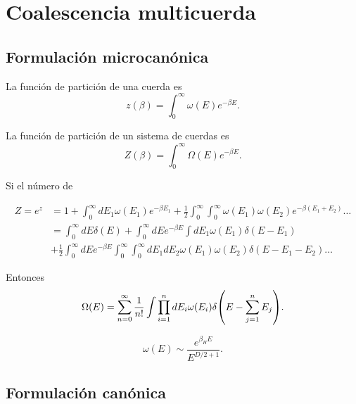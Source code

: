 \section{Coalescencia multicuerda}


\subsection{Formulación microcanónica}

La función de partición de una cuerda es
\begin{equation}
  z(\beta) = \int_0^\infty \omega(E)e^{-\beta E}.
\end{equation}

La función de partición de un sistema de cuerdas es
\begin{equation}
  Z(\beta) = \int_0^\infty \Omega(E)e^{-\beta E}.
\end{equation}

Si el número de 


\begin{equation}
  \begin{aligned}
      Z = e^z&= 1+ \int_0^\infty dE_1\omega(E_1)e^{-\beta E_1} +\frac 1 2 \int_0^\infty \int_0^\infty
      \omega(E_1)\omega(E_2)e^{-\beta(E_1+E_2)}\dots \\
      &=\int_0^\infty dE \delta(E) + \int_0^\infty dE e^{-\beta E}\int  dE_1\omega(E_1)\delta(E-E_1)\\
      &+\frac 1 2\int_0^\infty dE e^{-\beta E} \int_0^\infty\int_0^\infty dE_1 dE_2 \omega(E_1)\omega(E_2) \delta(E-E_1-E_2)\dots
  \end{aligned}
\end{equation}

Entonces
\begin{equation}
  \Omega(E)=\sum_{n=0}^\infty \frac{1}{n!}\int \prod_{i=1}^n dE_i \omega(E_i)\delta\qty(E-\sum_{j=1}^n E_j).
\end{equation}

\begin{equation}
  \omega(E)\sim \frac{e^{\beta_H E}}{E^{D/2+1}}.
\end{equation}


\subsection{Formulación canónica}

